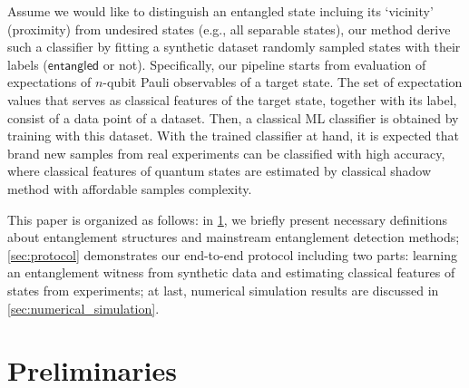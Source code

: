 \documentclass[
aps,
pra,
twocolumn,
floatfix,
]{revtex4-2}
\theoremstyle{plain}
\theoremstyle{definition}
\newtheorem{notation}{Notation}
\newcommand{\ew}{W}
\newcommand{\ob}{O}
\newcommand{\dm}{\rho}
\newcommand{\entangled}{\textsf{entangled}}
\newcommand{\hamiltonian}{\hat{H}}
\begin{document}
Assume we would like to distinguish an entangled state incluing its `vicinity' (proximity) from undesired states (e.g., all separable states), our method derive such a classifier by fitting a synthetic dataset randomly sampled states with their labels ($\entangled$ or not).
Specifically, our pipeline starts from evaluation of expectations of $n$-qubit Pauli observables of a target state. 
The set of expectation values that serves as classical features of the target state, together with its label, consist of a data point of a dataset.
Then, a classical ML classifier is obtained by training with this dataset.
With the trained classifier at hand, it is expected that brand new samples from real experiments can be classified with high accuracy, 
where classical features of quantum states are estimated by classical shadow method \cite{huangPredictingManyProperties2020} with affordable samples complexity.

This paper is organized as follows: in \cref{sec:preliminaries}, we briefly present necessary definitions about entanglement structures and mainstream entanglement detection methods;
\cref{sec:protocol} demonstrates our end-to-end protocol including two parts: learning an entanglement witness from synthetic data and estimating classical features of states from experiments;
at last, numerical simulation results are discussed in \cref{sec:numerical_simulation}.

\section{Preliminaries}\label{sec:preliminaries}
\end{document}
